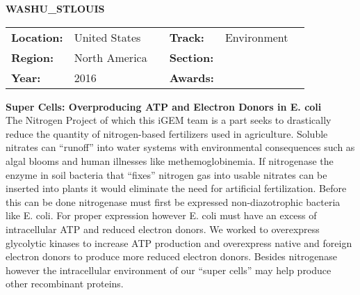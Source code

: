 \textbf{\uppercase{WashU\_StLouis}} \FloatBarrier \begin{table}[h] \begin{tabular}{lp{2.5cm}llll} \textbf{Location:} & United States & \multicolumn{1}{|l}{} & \textbf{Track:}   & Environment \\ \textbf{Region:}   & North America   & \multicolumn{1}{|l}{} & \textbf{Section:} &  \\ \textbf{Year:}     & 2016   & \multicolumn{1}{|l}{} & \textbf{Awards:}  & \end{tabular} \end{table} \FloatBarrier \noindent\textbf{Super Cells: Overproducing ATP and Electron Donors in E. coli} \vspace{.2cm}\\
The Nitrogen Project of which this iGEM team is a part seeks to drastically reduce the quantity of nitrogen-based fertilizers used in agriculture. Soluble nitrates can “runoff” into water systems with environmental consequences such as algal blooms and human illnesses like methemoglobinemia. If nitrogenase the enzyme in soil bacteria that “fixes” nitrogen gas into usable nitrates can be inserted into plants it would eliminate the need for artificial fertilization. Before this can be done nitrogenase must first be expressed non-diazotrophic bacteria like E. coli. For proper expression however E. coli must have an excess of intracellular ATP and reduced electron donors. We worked to overexpress glycolytic kinases to increase ATP production and overexpress native and foreign electron donors to produce more reduced electron donors. Besides nitrogenase however the intracellular environment of our “super cells” may help produce other recombinant proteins.
\vspace{2cm} $ $
\pagebreak

